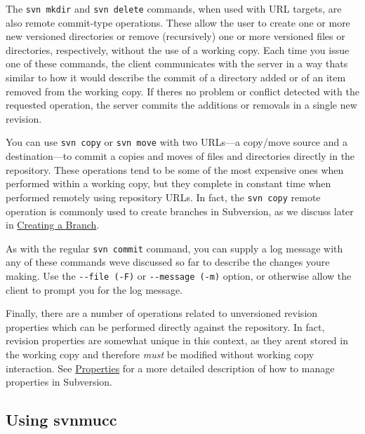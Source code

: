 The \texttt{svn\ mkdir} and \texttt{svn\ delete} commands, when used
with URL targets, are also remote commit-type operations. These allow
the user to create one or more new versioned directories or remove
(recursively) one or more versioned files or directories, respectively,
without the use of a working copy. Each time you issue one of these
commands, the client communicates with the server in a way
that\textquotesingle s similar to how it would describe the commit of a
directory added or of an item removed from the working copy. If
there\textquotesingle s no problem or conflict detected with the
requested operation, the server commits the additions or removals in a
single new revision.

You can use \texttt{svn\ copy} or \texttt{svn\ move} with two URLs---a
copy/move source and a destination---to commit a copies and moves of
files and directories directly in the repository. These operations tend
to be some of the most expensive ones when performed within a working
copy, but they complete in constant time when performed remotely using
repository URLs. In fact, the \texttt{svn\ copy} remote operation is
commonly used to create branches in Subversion, as we discuss later in
\hyperref[svn.branchmerge.using.create]{Creating a Branch}.

As with the regular \texttt{svn\ commit} command, you can supply a log
message with any of these commands we\textquotesingle ve discussed so
far to describe the changes you\textquotesingle re making. Use the
\texttt{-\/-file\ (-F)} or \texttt{-\/-message\ (-m)} option, or
otherwise allow the client to prompt you for the log message.

Finally, there are a number of operations related to unversioned
revision properties which can be performed directly against the
repository. In fact, revision properties are somewhat unique in this
context, as they aren\textquotesingle t stored in the working copy and
therefore \emph{must} be modified without working copy interaction. See
\hyperref[svn.advanced.props]{Properties} for a more detailed
description of how to manage properties in Subversion.

\subsection{Using
svnmucc}\label{svn.advanced.working-without-a-wc.svnmucc}

